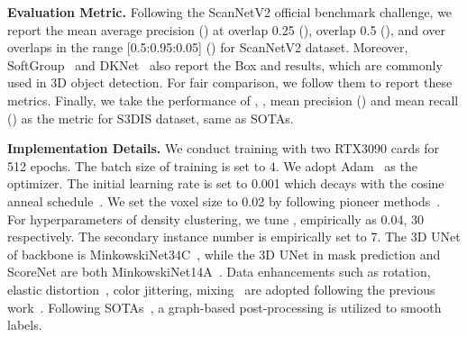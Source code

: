 \documentclass[10pt,twocolumn,letterpaper]{article}
\begin{document}
\noindent\textbf{Evaluation Metric.} Following the ScanNetV2 official benchmark challenge, we report the mean average precision  () at overlap 0.25 (), overlap 0.5 (), and over overlaps in the range [0.5:0.95:0.05] () for ScanNetV2 dataset.  Moreover, SoftGroup~\cite{vu2022softgroup} and DKNet~\cite{wu2022dknet}  also report the Box  and  results, which are commonly used in 3D object detection. For fair comparison, we follow them to report these metrics. Finally, we take the performance of , , mean precision () and mean recall () as the metric for S3DIS dataset, same as SOTAs. 

\noindent\textbf{Implementation Details.} We conduct training with two RTX3090 cards for 512 epochs. The batch size of training is set to 4. We adopt Adam~\cite{kingma2014adam} as the optimizer. The initial learning rate is set to 0.001 which decays with the cosine anneal schedule~\cite{loshchilov2016sgdr}. We set the voxel size to 0.02 by following pioneer methods~\cite{jiang2020pointgroup,chen2021hierarchical,he2021dyco3d}. For hyperparameters of density clustering, we tune  ,  empirically as 0.04, 30 respectively.  The secondary instance number  is empirically set to 7. The 3D UNet of backbone is MinkowskiNet34C~\cite{choy2019fully}, while the 3D UNet in mask prediction and ScoreNet are both MinkowskiNet14A~\cite{choy2019fully}. Data enhancements such as rotation, elastic distortion~\cite{ronneberger2015u}, color jittering, mixing~\cite{nekrasov2021mix3d} are adopted following the previous work~\cite{jiang2020pointgroup,nekrasov2021mix3d,vu2022softgroup}. Following SOTAs~\cite{wu2022dknet,han2020occuseg,liang2021instance}, a graph-based post-processing is utilized to smooth labels.
\end{document}
